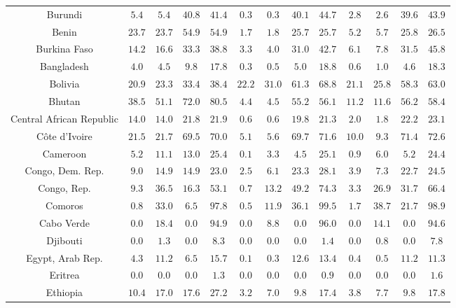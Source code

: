 \begin{longtable}{ccccccccccccc}
Burundi & $5.4$ & $5.4$ & $40.8$ & $41.4$ & $0.3$ & $0.3$ & $40.1$ & $44.7$ & $2.8$ & $2.6$ & $39.6$ & $43.9$ \\ 
Benin & $23.7$ & $23.7$ & $54.9$ & $54.9$ & $1.7$ & $1.8$ & $25.7$ & $25.7$ & $5.2$ & $5.7$ & $25.8$ & $26.5$ \\ 
Burkina Faso & $14.2$ & $16.6$ & $33.3$ & $38.8$ & $3.3$ & $4.0$ & $31.0$ & $42.7$ & $6.1$ & $7.8$ & $31.5$ & $45.8$ \\ 
Bangladesh & $4.0$ & $4.5$ & $9.8$ & $17.8$ & $0.3$ & $0.5$ & $5.0$ & $18.8$ & $0.6$ & $1.0$ & $4.6$ & $18.3$ \\ 
Bolivia & $20.9$ & $23.3$ & $33.4$ & $38.4$ & $22.2$ & $31.0$ & $61.3$ & $68.8$ & $21.1$ & $25.8$ & $58.3$ & $63.0$ \\ 
Bhutan & $38.5$ & $51.1$ & $72.0$ & $80.5$ & $4.4$ & $4.5$ & $55.2$ & $56.1$ & $11.2$ & $11.6$ & $56.2$ & $58.4$ \\ 
Central African Republic & $14.0$ & $14.0$ & $21.8$ & $21.9$ & $0.6$ & $0.6$ & $19.8$ & $21.3$ & $2.0$ & $1.8$ & $22.2$ & $23.1$ \\ 
Côte d'Ivoire & $21.5$ & $21.7$ & $69.5$ & $70.0$ & $5.1$ & $5.6$ & $69.7$ & $71.6$ & $10.0$ & $9.3$ & $71.4$ & $72.6$ \\ 
Cameroon & $5.2$ & $11.1$ & $13.0$ & $25.4$ & $0.1$ & $3.3$ & $4.5$ & $25.1$ & $0.9$ & $6.0$ & $5.2$ & $24.4$ \\ 
Congo, Dem. Rep. & $9.0$ & $14.9$ & $14.9$ & $23.0$ & $2.5$ & $6.1$ & $23.3$ & $28.1$ & $3.9$ & $7.3$ & $22.7$ & $24.5$ \\ 
Congo, Rep. & $9.3$ & $36.5$ & $16.3$ & $53.1$ & $0.7$ & $13.2$ & $49.2$ & $74.3$ & $3.3$ & $26.9$ & $31.7$ & $66.4$ \\ 
Comoros & $0.8$ & $33.0$ & $6.5$ & $97.8$ & $0.5$ & $11.9$ & $36.1$ & $99.5$ & $1.7$ & $38.7$ & $21.7$ & $98.9$ \\ 
Cabo Verde & $0.0$ & $18.4$ & $0.0$ & $94.9$ & $0.0$ & $8.8$ & $0.0$ & $96.0$ & $0.0$ & $14.1$ & $0.0$ & $94.6$ \\ 
Djibouti & $0.0$ & $1.3$ & $0.0$ & $8.3$ & $0.0$ & $0.0$ & $0.0$ & $1.4$ & $0.0$ & $0.8$ & $0.0$ & $7.8$ \\ 
Egypt, Arab Rep. & $4.3$ & $11.2$ & $6.5$ & $15.7$ & $0.1$ & $0.3$ & $12.6$ & $13.4$ & $0.4$ & $0.5$ & $11.2$ & $11.3$ \\ 
Eritrea & $0.0$ & $0.0$ & $0.0$ & $1.3$ & $0.0$ & $0.0$ & $0.0$ & $0.9$ & $0.0$ & $0.0$ & $0.0$ & $1.6$ \\ 
Ethiopia & $10.4$ & $17.0$ & $17.6$ & $27.2$ & $3.2$ & $7.0$ & $9.8$ & $17.4$ & $3.8$ & $7.7$ & $9.8$ & $17.8$ \\ 

\end{longtable}
